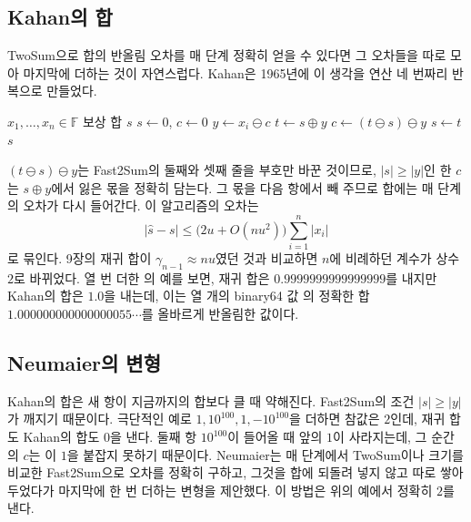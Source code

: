 \subsection{Kahan의 합}

TwoSum으로 합의 반올림 오차를 매 단계 정확히 얻을 수 있다면 그 오차들을 따로 모아 마지막에 더하는 것이 자연스럽다. Kahan은 1965년에 이 생각을 연산 네 번짜리 반복으로 만들었다\cite{kahan1965}.

\begin{algorithm}[t]
\begin{algorithmic}[1]
\Require $x_1,\dots,x_n\in\mathbb F$
\Ensure 보상 합 $s$
\State $s\gets0$, $c\gets0$ 
  \State $y\gets x_i\ominus c$ 
  \State $t\gets s\oplus y$
  \State $c\gets(t\ominus s)\ominus y$ 
  \State $s\gets t$
\EndFor
\State \Return $s$
\end{algorithmic}
\caption{Kahan의 보상 합}
\label{alg:kahan}
\end{algorithm}

$(t\ominus s)\ominus y$는 Fast2Sum의 둘째와 셋째 줄을 부호만 바꾼 것이므로, $|s|\ge|y|$인 한 $c$는 $s\oplus y$에서 잃은 몫을 정확히 담는다. 그 몫을 다음 항에서 빼 주므로 합에는 매 단계의 오차가 다시 들어간다. 이 알고리즘의 오차는
\[
|\hat s-s|\le\bigl(2u+O(nu^2)\bigr)\sum_{i=1}^n|x_i|
\]
로 묶인다\cite{goldberg1991,higham2002accuracy}. 9장의 재귀 합이 $\gamma_{n-1}\approx nu$였던 것과 비교하면 $n$에 비례하던 계수가 상수 $2$로 바뀌었다. 열 번 더한 의 예를 보면, 재귀 합은 $0.9999999999999999$를 내지만 Kahan의 합은 $1.0$을 내는데, 이는 열 개의 binary64 값 의 정확한 합 $1.000000000000000055\cdots$를 올바르게 반올림한 값이다.

\subsection{Neumaier의 변형}

Kahan의 합은 새 항이 지금까지의 합보다 클 때 약해진다. Fast2Sum의 조건 $|s|\ge|y|$가 깨지기 때문이다. 극단적인 예로 $1,10^{100},1,-10^{100}$을 더하면 참값은 $2$인데, 재귀 합도 Kahan의 합도 $0$을 낸다. 둘째 항 $10^{100}$이 들어올 때 앞의 $1$이 사라지는데, 그 순간의 $c$는 이 $1$을 붙잡지 못하기 때문이다. Neumaier는 매 단계에서 TwoSum이나 크기를 비교한 Fast2Sum으로 오차를 정확히 구하고, 그것을 합에 되돌려 넣지 않고 따로 쌓아 두었다가 마지막에 한 번 더하는 변형을 제안했다\cite{neumaier1974}. 이 방법은 위의 예에서 정확히 $2$를 낸다.

